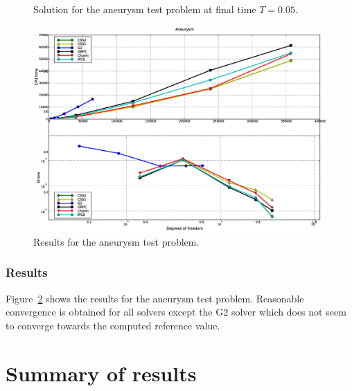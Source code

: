 \begin{figure}[htbp]
  \begin{center}
    \caption{Solution for the aneurysm test problem at final time $T = 0.05$.}
    \label{fig:aneurysm}
  \end{center}
\end{figure}

\begin{figure}
  \begin{center}
    \includegraphics[width=14cm]{chapters/kvs-1/eps/new_aneurysm_res.eps}
    \caption{Results for the aneurysm test problem.}
    \label{fig:aneurysm_res}
  \end{center}
\end{figure}

\subsubsection{Results}

Figure~\ref{fig:aneurysm_res} shows the results for the aneurysm test
problem. Reasonable convergence is obtained for all solvers except the
G2 solver which does not seem to converge towards the computed
reference value.

\section{Summary of results}

